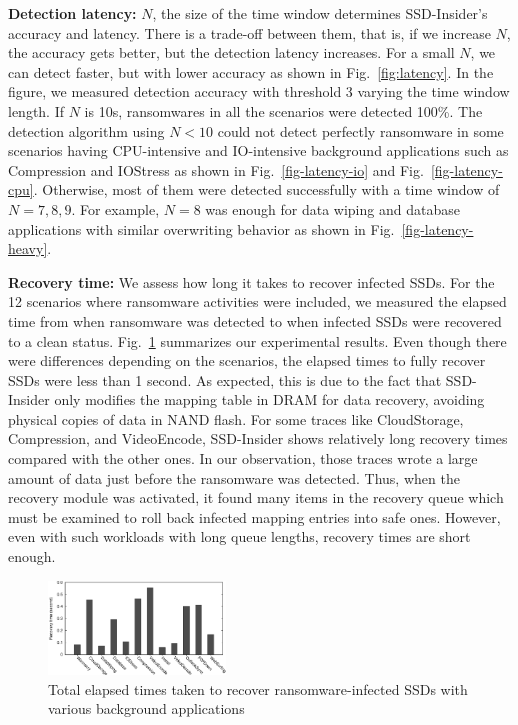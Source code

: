 \documentclass[conference]{IEEEtran}
\newcommand{\ours}{SSD-Insider}
\begin{document}
{\bf Detection latency:}
$N$, the size of the time window determines \ours{}'s accuracy and
latency.  There is a trade-off between them, that is, if we
increase $N$, the accuracy gets better, but the detection latency
increases. For a small $N$, we can detect faster, but with lower
accuracy as shown in Fig.~\ref{fig:latency}.  In the figure, we
measured detection accuracy with threshold 3 varying the time
window length.  If $N$ is 10s, ransomwares in all the scenarios
were detected 100\%.  The detection algorithm using $N<10$ could
not detect perfectly ransomware in some scenarios having
CPU-intensive and IO-intensive background applications such as
Compression and IOStress as shown in Fig.~\ref{fig-latency-io} and
Fig.~\ref{fig-latency-cpu}.  Otherwise, most of them were detected
successfully with a time window of $N=7,8,9$.  For example, $N=8$
was enough for data wiping and database applications with similar
overwriting behavior as shown in Fig.~\ref{fig-latency-heavy}.

{\bf Recovery time:}
We assess how long it takes to recover infected SSDs. For the 12
scenarios where ransomware activities were included, we measured
the elapsed time from when ransomware was detected to when infected
SSDs were recovered to a clean status.
Fig.~\ref{fig:flash-recovery} summarizes our experimental results.
Even though there were differences depending on the scenarios, the
elapsed times to fully recover SSDs were less than 1 second. As
expected, this is due to the fact that \ours{} only modifies the
mapping table in DRAM for data recovery, avoiding physical copies
of data in NAND flash.  For some traces like CloudStorage,
Compression, and VideoEncode, \ours{} shows relatively long
recovery times compared with the other ones.  In our observation,
those traces wrote a large amount of data just before the
ransomware was detected. Thus, when the recovery module was
activated, it found many items in the recovery queue which must be
examined to roll back infected mapping entries into safe ones.
However, even with such workloads with long queue lengths, recovery
times are short enough.

\begin{figure}[t] 
	\centering 
	\includegraphics[width=0.42\textwidth]{exp/recovery/fig}
	\caption{
Total elapsed times taken to recover ransomware-infected SSDs with
various background applications
} 
	\label{fig:flash-recovery} 
\end{figure}
\end{document}
